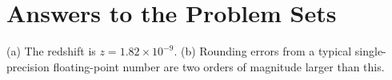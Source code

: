 
\chapter{Answers to the Problem Sets}

\newslide
\problemset

\newslide

\begin{problem}
(a) The redshift is $z = 1.82 \times 10^{-9}$. (b) Rounding errors from a
typical single-precision floating-point number are two orders
of magnitude larger than this.
\end{problem}

\newslide

%

